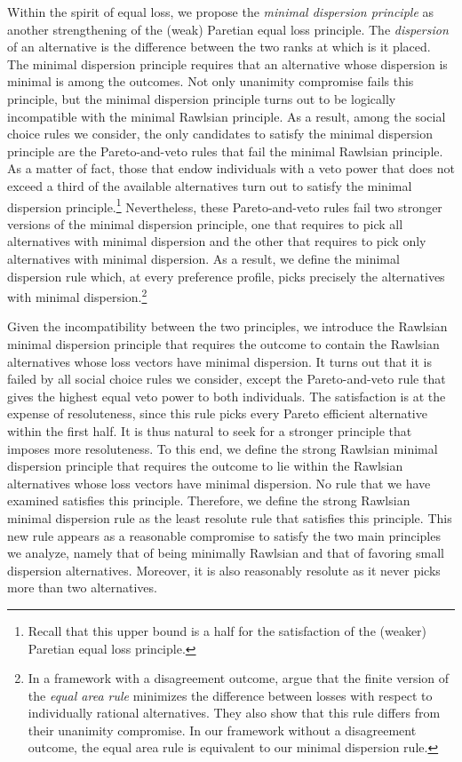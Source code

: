 \documentclass[pagesize, twoside=off, bibliography=totoc, DIV=calc, fontsize=12pt, a4paper]{scrartcl}
\begin{document}
Within the spirit of equal loss, we propose the \textit{minimal dispersion principle} as another strengthening of the (weak) Paretian equal loss principle. The \textit{dispersion} of an alternative is the difference between the two ranks at which is it placed. The minimal dispersion principle requires that an alternative whose dispersion is minimal is among the outcomes. Not only unanimity compromise fails this principle, but the minimal dispersion principle turns out to be logically incompatible with the minimal Rawlsian principle. As a result, among the social choice rules we consider, the only candidates to satisfy the minimal dispersion principle are the Pareto-and-veto rules that fail the minimal Rawlsian principle. As a matter of fact, those that endow individuals with a veto power that does not exceed a third of the available alternatives turn out to satisfy the minimal dispersion principle.\footnote{Recall that this upper bound is a half for the satisfaction of the (weaker) Paretian equal loss principle.} Nevertheless, these Pareto-and-veto rules fail two stronger versions of the minimal dispersion principle, one that requires to pick all alternatives with minimal dispersion and the other that requires to pick only alternatives with minimal dispersion. As a result, we define the minimal dispersion rule which, at every preference profile, picks precisely the alternatives with minimal dispersion.\footnote{
\label{ft:equalarea}
In a framework with a disagreement outcome, \citet{KibrisSertel2007} argue that the finite version of the \textit{equal area rule} \citep{thomson1994cooperative} minimizes the difference between losses with respect to individually rational alternatives. They also show that this rule differs from their unanimity compromise. In our framework without a disagreement outcome, the equal area rule is equivalent to our minimal dispersion rule.}

Given the incompatibility between the two principles, we introduce the Rawlsian minimal dispersion principle that requires the outcome to contain the Rawlsian alternatives whose loss vectors have minimal dispersion. It turns out that it is failed by all social choice rules we consider, except the Pareto-and-veto rule that gives the highest equal veto power to both individuals. The satisfaction is at the expense of resoluteness, since this rule picks every Pareto efficient alternative within the first half. It is thus natural to seek for a stronger principle that imposes more resoluteness. To this end, we define the strong Rawlsian minimal dispersion principle that requires the outcome to lie within the Rawlsian alternatives whose loss vectors have minimal dispersion. No rule that we have examined satisfies this principle. Therefore, we define the strong Rawlsian minimal dispersion rule as the least resolute rule that satisfies this principle. This new rule appears as a reasonable compromise to satisfy the two main principles we analyze, namely that of being minimally Rawlsian and that of favoring small dispersion alternatives. Moreover, it is also reasonably resolute as it never picks more than two alternatives.
\end{document}
